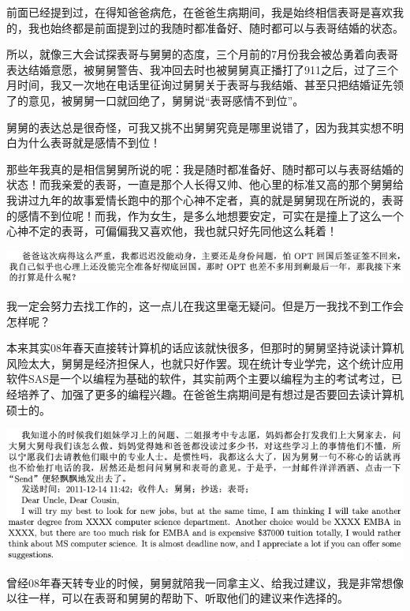 \documentclass[9pt, b5paper]{article}
\begin{document}
前面已经提到过，在得知爸爸病危，在爸爸生病期间，我是始终相信表哥是喜欢我的，我也始终都是前面提到过的我随时都准备好、随时都可以与表哥结婚的状态。

所以，就像三大会试探表哥与舅舅的态度，三个月前的7月份我会被怂勇着向表哥表达结婚意愿，被舅舅警告、我冲回去时也被舅舅真正播打了911之后，过了三个月时间，我又一次地在电话里征询过舅舅关于表哥与我结婚、甚至只把结婚证先领了的意见，被舅舅一口就回绝了，舅舅说“表哥感情不到位”。

舅舅的表达总是很奇怪，可我又挑不出舅舅究竟是哪里说错了，因为我其实想不明白为什么表哥就是感情不到位！

那些年我真的是相信舅舅所说的呢：我是随时都准备好、随时都可以与表哥结婚的状态！而我亲爱的表哥，一直是那个人长得又帅、他心里的标准又高的那个舅舅给我讲过九年的故事爱情长跑中的那个心神不定者，真的就是舅舅现在所说的，表哥的感情不到位呢！而我，作为女生，是多么地想要安定，可实在是撞上了这么一个心神不定的表哥，可偏偏我又喜欢他，我也就只好先同他这么耗着！

\begin{center}
\includegraphics[width=.9\linewidth]{./pic/backups_plans_20210414_160826.png}
\end{center}

我一定会努力去找工作的，这一点儿在我这里毫无疑问。但是万一我找不到工作会怎样呢？

本来其实08年春天直接转计算机的话应该就快很多，但那时的舅舅坚持说读计算机风险太大，舅舅是经济担保人，也就只好作罢。现在统计专业学完，这个统计应用软件SAS是一个以编程为基础的软件，其实前两个主要以编程为主的考试考过，已经培养了、加强了更多的编程兴趣。在爸爸生病期间是有想过是否要回去读计算机硕士的。 

\begin{center}
\includegraphics[width=.9\linewidth]{./pic/backups_plans_20210414_161113.png}
\end{center}

曾经08年春天转专业的时候，舅舅就陪我一同拿主义、给我过建议，我是非常想像以往一样，可以在表哥和舅舅的帮助下、听取他们的建议来作选择的。
\end{document}
